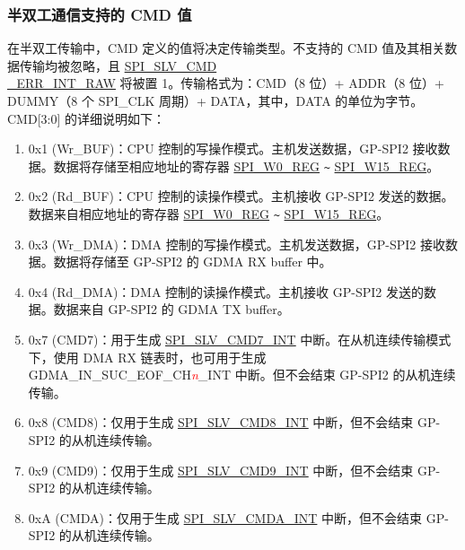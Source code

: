 \documentclass[main\_\_CN.tex]{subfiles}
\begin{document}
\subsubsection{半双工通信支持的 CMD 值} \label{sec:spi-cmd-values-half-duplex}

在半双工传输中，CMD 定义的值将决定传输类型。不支持的 CMD 值及其相关数据传输均被忽略，且 \hyperref[fielddesc:SPISLVCMDERRINTRAW]{SPI\_SLV\_CMD\\\_ERR\_INT\_RAW} 将被置 1。传输格式为：CMD（8 位）+ ADDR（8 位）+ DUMMY（8 个 SPI\_CLK 周期）+ DATA，其中，DATA 的单位为字节。CMD[3:0] 的详细说明如下：

\begin{enumerate}
    \item \label{other:spi-item-wrbuf} 0x1 (Wr\_BUF)：CPU 控制的写操作模式。主机发送数据，GP-SPI2 接收数据。数据将存储至相应地址的寄存器 \hyperref[regdesc:SPIW0REG]{SPI\_W0\_REG} \verb+~+ \hyperref[regdesc:SPIW15REG]{SPI\_W15\_REG}。

    \item \label{other:spi-item-rdbuf} 0x2 (Rd\_BUF)：CPU 控制的读操作模式。主机接收 GP-SPI2 发送的数据。数据来自相应地址的寄存器 \hyperref[regdesc:SPIW0REG]{SPI\_W0\_REG} \verb+~+ \hyperref[regdesc:SPIW15REG]{SPI\_W15\_REG}。

    \item \label{other:spi-item-wrdma} 0x3 (Wr\_DMA)：DMA 控制的写操作模式。主机发送数据，GP-SPI2 接收数据。数据将存储至 GP-SPI2 的 GDMA RX buffer 中。

    \item 0x4 (Rd\_DMA)：DMA 控制的读操作模式。主机接收 GP-SPI2 发送的数据。数据来自 GP-SPI2 的 GDMA TX buffer。

    \item \label{other:spi-item-cmd7} 0x7 (CMD7)：用于生成 \hyperref[int:SPISLVCMD7INT]{SPI\_SLV\_CMD7\_INT} 中断。在从机连续传输模式下，使用 DMA RX 链表时，也可用于生成 GDMA\_IN\_SUC\_EOF\_CH\textcolor{red}{\it{n}}\_INT  中断。但不会结束 GP-SPI2 的从机连续传输。

    \item 0x8 (CMD8)：仅用于生成 \hyperref[int:SPISLVCMD8INT]{SPI\_SLV\_CMD8\_INT} 中断，但不会结束 GP-SPI2 的从机连续传输。

    \item 0x9 (CMD9)：仅用于生成 \hyperref[int:SPISLVCMD9INT]{SPI\_SLV\_CMD9\_INT} 中断，但不会结束 GP-SPI2 的从机连续传输。

    \item 0xA (CMDA)：仅用于生成 \hyperref[int:SPISLVCMDAINT]{SPI\_SLV\_CMDA\_INT} 中断，但不会结束 GP-SPI2 的从机连续传输。

\end{enumerate}
\end{document}
